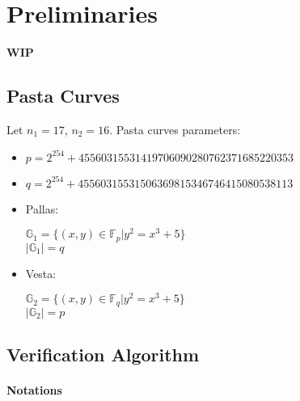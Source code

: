 \section{Preliminaries}
\label{section:preliminaries}
\textbf{WIP}

\subsection{Pasta Curves}

Let $n_1 = 17$, $n_2 = 16$.
Pasta curves parameters:
\begin{itemize}
    \item $p = 2^{254} + 45560315531419706090280762371685220353$
    \item $q = 2^{254} + 45560315531506369815346746415080538113$
    \item Pallas:
    \begin{center}
        $\mathbb{G}_1 = \{ (x, y) \in \mathbb{F}_p | y^2 = x^3 + 5 \}$ \\
        $|\mathbb{G}_1| = q$
    \end{center}
    \item Vesta:
    \begin{center}
        $\mathbb{G}_2 = \{ (x, y) \in \mathbb{F}_q | y^2 = x^3 + 5 \}$ \\
        $|\mathbb{G}_2| = p$
    \end{center}
\end{itemize}

\subsection{Verification Algorithm}

\paragraph{Notations}

